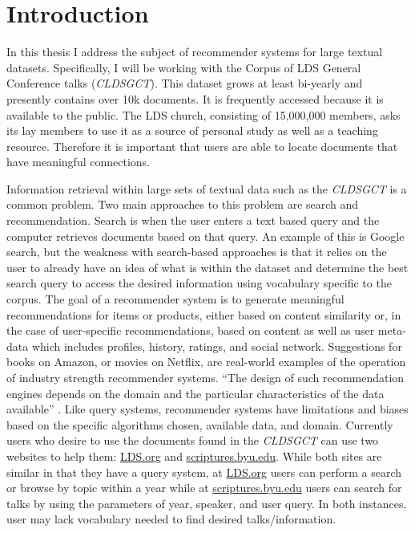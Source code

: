 \chapter{Introduction}

In this thesis I address the subject of recommender systems for large textual datasets. Specifically, I will be working with the Corpus of LDS General Conference talks (\textit{CLDSGCT}). This dataset grows at least bi-yearly and presently contains over 10k documents. It is frequently accessed because it is available to the public. The LDS church, consisting of 15,000,000 members, asks its lay members to use it as a source of personal study as well as a teaching resource. Therefore it is important that users are able to locate documents that have meaningful connections.

Information retrieval within large sets of textual data such as the \textit{CLDSGCT} is a common problem. Two main approaches to this problem are search and recommendation. Search is when the user enters a text based query and the computer retrieves documents based on that query. An example of this is Google search, but the weakness with search-based approaches is that it relies on the user to already have an idea of what is within the dataset and determine the best search query to access the desired information using vocabulary specific to the corpus. The goal of a recommender system is to generate meaningful recommendations for items or products, either based on content similarity or, in the case of user-specific recommendations, based on content as well as user meta-data which includes profiles, history, ratings, and social network. Suggestions for books on Amazon, or movies on Netflix, are real-world examples of the operation of industry strength recommender systems. ``The design of such recommendation engines depends on the domain and the particular characteristics of the data available'' \citep{Melville2010}. Like query systems, recommender systems have limitations and biases based on the specific algorithms chosen, available data, and domain. Currently users who desire to use the documents found in the \textit{CLDSGCT} can use two websites to help them: \url{LDS.org} and \url{scriptures.byu.edu}. While both sites are similar in that they have a query system, at \url{LDS.org} users can perform a search or browse by topic within a year while at \url{scriptures.byu.edu} users can search for talks by using the parameters of year, speaker, and user query. In both instances, user may lack vocabulary needed to find desired talks/information.

